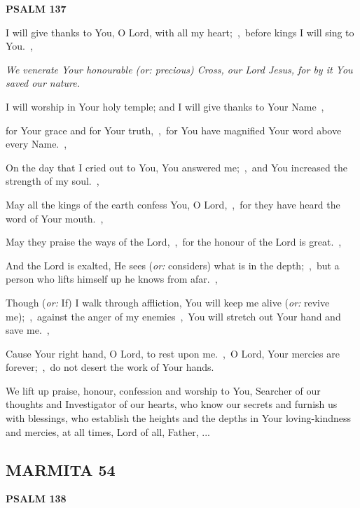 \documentclass[12pt,twoside,a5paper]{article}
\newcommand{\marmita}[1]{\subsection*{MARMITA {#1}}}
\newcommand{\psalm}[1]{\textbf{PSALM {#1}}\nopagebreak}
\newcommand{\qanona}[1]{{\liturgicalhint{Qanona.} \emph{#1}}}
\newcommand{\slota}[1]{\liturgicalhint{Slota.} #1}
\newcommand{\translationoption}[1]{\emph{or:} #1}
\begin{document}
\psalm{137}

\begin{normalparskip}
  I will give thanks to You, O Lord, with all my heart;~\sep\ before kings I will sing to You.~\sep

  \qanona{We venerate Your honourable (\translationoption{precious}) Cross, our Lord Jesus, for by it You saved our nature.}

  I will worship in Your holy temple; and I will give thanks to Your Name~\sep

  for Your grace and for Your truth,~\sep\ for You have magnified Your word above every Name.~\sep

  On the day that I cried out to You, You answered me;~\sep\ and You increased the strength of my soul.~\sep

  May all the kings of the earth confess You, O Lord,~\sep\ for they have heard the word of Your mouth.~\sep

  May they praise the ways of the Lord,~\sep\ for the honour of the Lord is great.~\sep

  And the Lord is exalted, He sees (\translationoption{considers}) what is in the depth;~\sep\ but a person who lifts himself up he knows from afar.~\sep

  Though (\translationoption{If}) I walk through affliction, You will keep me alive (\translationoption{revive me});~\sep\ against the anger of my enemies~\sep\ You will stretch out Your hand and save me.~\sep

  Cause Your right hand, O Lord, to rest upon me.~\sep\ O Lord, Your mercies are forever;~\sep\ do not desert the work of Your hands.
\end{normalparskip}

\slota{We lift up praise, honour, confession and worship to You, Searcher of our thoughts and Investigator of our hearts, who know our secrets and furnish us with blessings, who establish the heights and the depths in Your loving-kindness and mercies, at all times, Lord of all, Father, ...}

\marmita{54}

\psalm{138}
\end{document}
